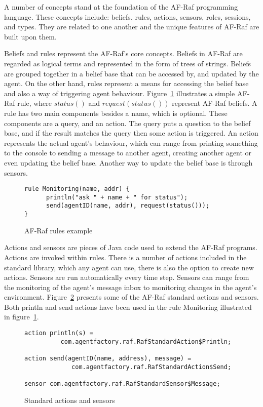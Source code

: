 \documentclass[a4paper,12pt,oneside,fleqn]{book} %
\theoremstyle{plain}
\theoremstyle{definition}
\theoremstyle{remark}
\begin{document}
A number of concepts stand at the foundation of the AF-Raf programming
language. These concepts include: beliefs, rules, actions, sensors, roles,
sessions, and types. They are related to one another and the unique
features of AF-Raf are built upon them. 

Beliefs and rules represent the AF-Raf's core concepts. Beliefs in AF-Raf
are regarded as logical terms and represented in the form of trees of
strings. Beliefs are grouped together in a belief base that can be accessed
by, and updated by the agent. On the other hand, rules represent a means
for accessing the belief base and also a way of triggering agent behaviour.
Figure~\ref{fig:rule} illustrates a simple AF-Raf rule, where $status()$ and
$request(status())$ represent AF-Raf beliefs. A rule has
two main components besides a name, which is optional. These components are
a query, and an action. The query puts a question to the belief base, and
if the result matches the query then some action is triggered.  An action
represents the actual agent's behaviour, which can range from printing
something to the console to sending a message to another agent, creating
another agent or even updating the belief base.  Another way to update the
belief base is through sensors.

\begin{figure}\footnotesize %
\begin{verbatim}
rule Monitoring(name, addr) {
      println("ask " + name + " for status");
      send(agentID(name, addr), request(status()));
}
\end{verbatim}
\caption{AF-Raf rules example}
\label{fig:rule}
\end{figure} %

Actions and sensors are pieces of Java code used to extend the AF-Raf
programs. Actions are invoked within rules. There is a number of actions
included in the standard library, which any agent can use, there is also the
option to create new actions. Sensors are run automatically every time
step. Sensors can range from the monitoring of the agent's message inbox to
monitoring changes in the agent's environment.
Figure~\ref{fig:actions-sensors} presents some of the AF-Raf standard actions and
sensors. Both println and send actions have been used in the rule
Monitoring illustrated in figure~\ref{fig:rule}.


\begin{figure}\footnotesize %
\begin{verbatim}
action println(s) = 
          com.agentfactory.raf.RafStandardAction$Println;

action send(agentID(name, address), message) = 
             com.agentfactory.raf.RafStandardAction$Send;

sensor com.agentfactory.raf.RafStandardSensor$Message;
\end{verbatim}
\caption{Standard actions and sensors}
\label{fig:actions-sensors}
\end{figure} %
\end{document}
